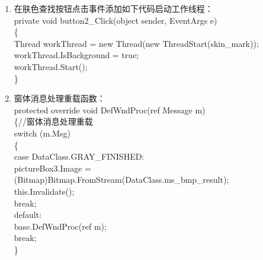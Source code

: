 ﻿\documentclass[12pt,a4paper,oneside]{book}
\begin{document}
\begin{enumerate}
\hspace*{2em}\}       \\
\hspace*{0em}\} \\
\item 在肤色查找按钮点击事件添加如下代码启动工作线程：\\
\hspace*{2em}private void button2\_Click(object sender, EventArgs e)\\
\hspace*{2em}\{\\
\hspace*{4em}Thread workThread = new Thread(new ThreadStart(skin\_mark));\\
\hspace*{4em}workThread.IsBackground = true;\\
\hspace*{4em}workThread.Start();  \\
\hspace*{2em}\}\\
\item 窗体消息处理重载函数：\\
\hspace*{2em}protected override void DefWndProc(ref Message m)\\
\hspace*{2em}\{//窗体消息处理重载\\
\hspace*{4em}switch (m.Msg)\\
\hspace*{4em}\{\\
\hspace*{6em}case DataClass.GRAY\_FINISHED: \\
\hspace*{8em}pictureBox3.Image = (Bitmap)Bitmap.FromStream(DataClass.ms\_bmp\_result);\\
\hspace*{8em}this.Invalidate();\\
\hspace*{8em}break;\\
\hspace*{6em}default:\\
\hspace*{8em}base.DefWndProc(ref m);\\
\hspace*{8em}break;\\
\hspace*{4em}\}\\

\end{enumerate}
\end{document}
